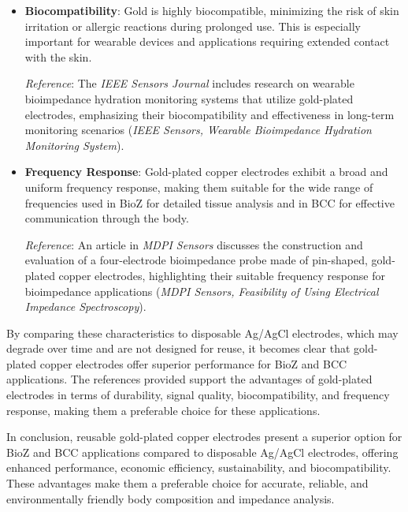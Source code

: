 {\begin{enumerate}
\begin{itemize}
    \item \textbf{Biocompatibility}: Gold is highly biocompatible, minimizing the risk of skin irritation or allergic reactions during prolonged use. This is especially important for wearable devices and applications requiring extended contact with the skin.
    
    \textit{Reference}: The \textit{IEEE Sensors Journal} includes research on wearable bioimpedance hydration monitoring systems that utilize gold-plated electrodes, emphasizing their biocompatibility and effectiveness in long-term monitoring scenarios (\textit{IEEE Sensors, Wearable Bioimpedance Hydration Monitoring System}).
    
    \item \textbf{Frequency Response}: Gold-plated copper electrodes exhibit a broad and uniform frequency response, making them suitable for the wide range of frequencies used in BioZ for detailed tissue analysis and in BCC for effective communication through the body.
    
    \textit{Reference}: An article in \textit{MDPI Sensors} discusses the construction and evaluation of a four-electrode bioimpedance probe made of pin-shaped, gold-plated copper electrodes, highlighting their suitable frequency response for bioimpedance applications (\textit{MDPI Sensors, Feasibility of Using Electrical Impedance Spectroscopy}).
\end{itemize}

By comparing these characteristics to disposable Ag/AgCl electrodes, which may degrade over time and are not designed for reuse, it becomes clear that gold-plated copper electrodes offer superior performance for BioZ and BCC applications. The references provided support the advantages of gold-plated electrodes in terms of durability, signal quality, biocompatibility, and frequency response, making them a preferable choice for these applications.

    
\end{enumerate}

In conclusion, reusable gold-plated copper electrodes present a superior option for BioZ and BCC applications compared to disposable Ag/AgCl electrodes, offering enhanced performance, economic efficiency, sustainability, and biocompatibility. These advantages make them a preferable choice for accurate, reliable, and environmentally friendly body composition and impedance analysis.


}


